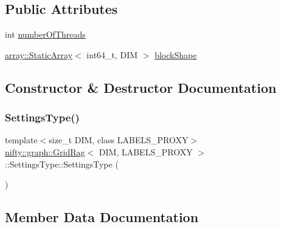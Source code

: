 \subsection*{Public Attributes}
\begin{DoxyCompactItemize}
\item 
int \hyperlink{structnifty_1_1graph_1_1GridRag_1_1SettingsType_a2296f315ec18eac36fd00c16d43fb6a7}{number\+Of\+Threads}
\item 
\hyperlink{namespacenifty_1_1array_a683f151f19c851754e0c6d55ed16a0c2}{array\+::\+Static\+Array}$<$ int64\+\_\+t, D\+IM $>$ \hyperlink{structnifty_1_1graph_1_1GridRag_1_1SettingsType_a08a6ef3ff2a5bf6b61d4b52179ba29c7}{block\+Shape}
\end{DoxyCompactItemize}


\subsection{Constructor \& Destructor Documentation}
\mbox{\label{structnifty_1_1graph_1_1GridRag_1_1SettingsType_a635006df3b75d3bbeaec306efef6ca8e}} 
\subsubsection{\texorpdfstring{Settings\+Type()}{SettingsType()}}
{\footnotesize\ttfamily template$<$size\+\_\+t D\+IM, class L\+A\+B\+E\+L\+S\+\_\+\+P\+R\+O\+XY$>$ \\
\hyperlink{classnifty_1_1graph_1_1GridRag}{nifty\+::graph\+::\+Grid\+Rag}$<$ D\+IM, L\+A\+B\+E\+L\+S\+\_\+\+P\+R\+O\+XY $>$\+::Settings\+Type\+::\+Settings\+Type (\begin{DoxyParamCaption}{ }\end{DoxyParamCaption})\hspace{0.3cm}{\ttfamily [inline]}}



\subsection{Member Data Documentation}
\mbox{\label{structnifty_1_1graph_1_1GridRag_1_1SettingsType_a08a6ef3ff2a5bf6b61d4b52179ba29c7}} 
